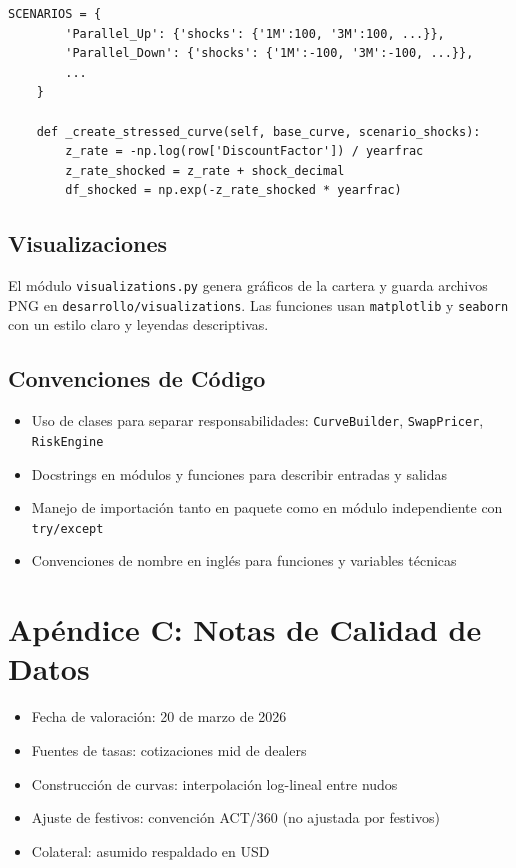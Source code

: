 \documentclass[12pt,a4paper]{article}
\begin{document}
\begin{lstlisting}[caption={Extracción de \texttt{risk.py}}]
    SCENARIOS = {
        'Parallel_Up': {'shocks': {'1M':100, '3M':100, ...}},
        'Parallel_Down': {'shocks': {'1M':-100, '3M':-100, ...}},
        ...
    }

    def _create_stressed_curve(self, base_curve, scenario_shocks):
        z_rate = -np.log(row['DiscountFactor']) / yearfrac
        z_rate_shocked = z_rate + shock_decimal
        df_shocked = np.exp(-z_rate_shocked * yearfrac)
\end{lstlisting}

\subsection*{Visualizaciones}
El módulo \texttt{visualizations.py} genera gráficos de la cartera y guarda archivos PNG en \texttt{desarrollo/visualizations}. Las funciones usan \texttt{matplotlib} y \texttt{seaborn} con un estilo claro y leyendas descriptivas.

\subsection*{Convenciones de Código}
\begin{itemize}
    \item Uso de clases para separar responsabilidades: \texttt{CurveBuilder}, \texttt{SwapPricer}, \texttt{RiskEngine}
    \item Docstrings en módulos y funciones para describir entradas y salidas
    \item Manejo de importación tanto en paquete como en módulo independiente con \texttt{try/except}
    \item Convenciones de nombre en inglés para funciones y variables técnicas
\end{itemize}

\section*{Apéndice C: Notas de Calidad de Datos}
\begin{itemize}
    \item Fecha de valoración: 20 de marzo de 2026
    \item Fuentes de tasas: cotizaciones mid de dealers
    \item Construcción de curvas: interpolación log-lineal entre nudos
    \item Ajuste de festivos: convención ACT/360 (no ajustada por festivos)
    \item Colateral: asumido respaldado en USD
\end{itemize}
\end{document}
